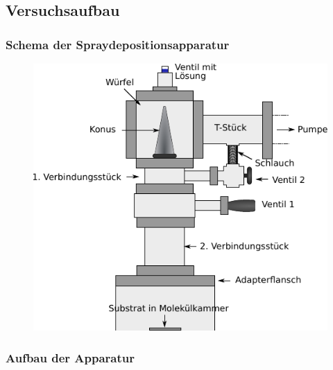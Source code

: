 \documentclass{beamer}
\begin{document}


\subsection[Versuchsaufbau]{Versuchsaufbau}

\begin{frame}
\frametitle{Schema der Spraydepositionsapparatur}
\begin{figure}[H]
\centering
\includegraphics{bilder/wuerfelklein.pdf}
\end{figure}
\end{frame}


\begin{frame}
\frametitle{Aufbau der Apparatur}
\begin{figure}[H]
\centering

\end{figure}
\end{frame}

\end{document}
